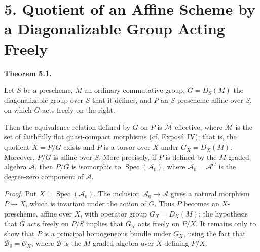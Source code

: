 

\section*{5. Quotient of an Affine Scheme by a Diagonalizable Group Acting Freely}

\medskip
\noindent{}\textbf{Theorem 5.1.}
\begin{itshape}
Let \(S\) be a prescheme, \(M\) an ordinary commutative group,
\(G=D_S(M)\) the diagonalizable group over \(S\) that it defines, and
\(P\) an \(S\)-prescheme affine over \(S\), on which \(G\) acts freely on
the right.

Then the equivalence relation defined by \(G\) on \(P\) is
\(\mathcal M\)-effective, where \(\mathcal M\) is the set of faithfully
flat quasi-compact morphisms (cf. Expos\'e~IV); that is, the quotient
\(X=P/G\) exists and \(P\) is a torsor over \(X\) under
\(G_X=D_X(M)\). Moreover, \(P/G\) is affine over \(S\). More precisely,
if \(P\) is defined by the \(M\)-graded algebra \(\mathcal A\), then
\(P/G\) is isomorphic to \(\operatorname{Spec}(\mathcal A_0)\), where
\(\mathcal A_0=\mathcal A^G\) is the degree-zero component of
\(\mathcal A\).
\end{itshape}

\smallskip
\noindent\textit{Proof.}
Put \(X=\operatorname{Spec}(\mathcal A_0)\). The inclusion
\(\mathcal A_0\to\mathcal A\) gives a natural morphism \(P\to X\), which
is invariant under the action of \(G\). Thus \(P\) becomes an
\(X\)-prescheme, affine over \(X\), with operator group
\(G_X=D_X(M)\); the hypothesis that \(G\) acts freely on \(P/S\) implies
that \(G_X\) acts freely on \(P/X\). It remains only to show that \(P\)
is a principal homogeneous bundle under \(G_X\), using the fact that
\(\mathcal B_0=\mathcal O_X\), where \(\mathcal B\) is the \(M\)-graded
algebra over \(X\) defining \(P/X\).


